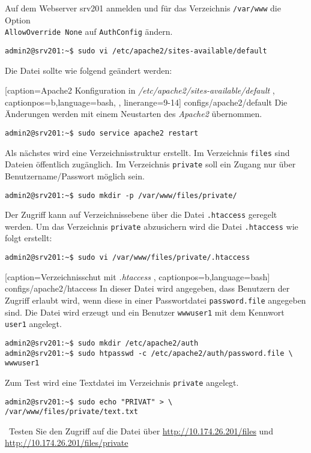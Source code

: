 Auf dem Webserver srv201 anmelden und für das Verzeichnis \texttt{/var/www} die 
Option \\
\texttt{AllowOverride None} auf \texttt{AuthConfig} ändern.
\begin{lstlisting}
admin2@srv201:~$ sudo vi /etc/apache2/sites-available/default
\end{lstlisting}
Die Datei sollte wie folgend geändert werden:

    [caption={Apache2 Konfiguration in
    \textit{/etc/apache2/sites-available/default}} \label{lst:default},
       captionpos=b,language=bash, , linerange=9-14]
{configs/apache2/default}
Die Änderungen werden mit einem Neustarten des \textit{Apache2} übernommen.
\begin{lstlisting}
admin2@srv201:~$ sudo service apache2 restart
\end{lstlisting}
Als nächstes wird eine Verzeichnisstruktur erstellt. Im Verzeichnis
\texttt{files} sind Dateien öffentlich zugänglich. Im Verzeichnis
\texttt{private} soll ein Zugang nur über Benutzername/Passwort möglich sein.
\begin{lstlisting}
admin2@srv201:~$ sudo mkdir -p /var/www/files/private/
\end{lstlisting}
Der Zugriff kann auf Verzeichnissebene über die Datei \texttt{.htaccess}
geregelt werden. Um das Verzeichnis \texttt{private} abzusichern wird die Datei
\texttt{.htaccess} wie folgt erstellt:
\begin{lstlisting}
admin2@srv201:~$ sudo vi /var/www/files/private/.htaccess
\end{lstlisting}

    [caption={Verzeichnisschut mit \textit{.htaccess}}
    \label{lst:htaccess},
    captionpos=b,language=bash] {configs/apache2/htaccess}
In dieser Datei wird angegeben, dass Benutzern der Zugriff erlaubt wird, wenn
diese in einer Passwortdatei \texttt{password.file} angegeben sind. Die Datei
wird erzeugt und ein Benutzer \texttt{wwwuser1} mit dem Kennwort \texttt{user1}
angelegt.
\begin{lstlisting}
admin2@srv201:~$ sudo mkdir /etc/apache2/auth
admin2@srv201:~$ sudo htpasswd -c /etc/apache2/auth/password.file \
wwwuser1
\end{lstlisting}
Zum Test wird eine Textdatei im Verzeichnis \texttt{private} angelegt.
\begin{lstlisting}
admin2@srv201:~$ sudo echo "PRIVAT" > \
/var/www/files/private/text.txt
\end{lstlisting}\
Testen Sie den Zugriff auf die Datei über
\url{http://10.174.26.201/files} und \url{http://10.174.26.201/files/private}

